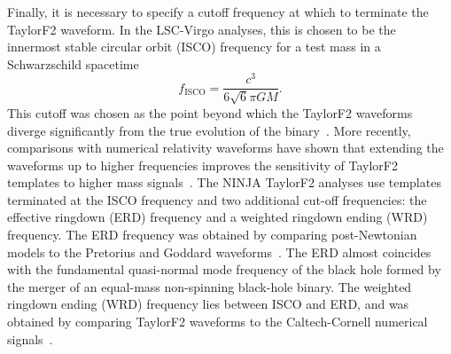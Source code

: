 Finally, it is necessary to specify a cutoff frequency at which to terminate the
TaylorF2 waveform. In the LSC-Virgo analyses, this is chosen to be the
innermost stable circular orbit (ISCO) frequency for a test mass in a
Schwarzschild spacetime 
%
\begin{equation}
\label{f_ISCO}
f_\mathrm{ISCO} = \frac{c^3}{6\sqrt{6}\pi GM}.
\end{equation}
%
This cutoff was chosen as the point beyond which the TaylorF2 waveforms
diverge significantly from the true evolution of the
binary~\cite{Blanchet:2002av}.  More recently, comparisons with numerical
relativity waveforms have shown that extending the waveforms up to higher
frequencies improves the sensitivity of TaylorF2 templates to higher mass
signals~\cite{Pan:2007nw,Boyle:2009dg}. The NINJA TaylorF2 analyses use
templates terminated at the ISCO frequency and two additional cut-off
frequencies: the effective ringdown (ERD) frequency and a weighted
ringdown ending (WRD) frequency. The ERD frequency was obtained by comparing
post-Newtonian models to the Pretorius and Goddard
waveforms~\cite{Pan:2007nw}. The ERD almost coincides with the fundamental
quasi-normal mode frequency of the black hole formed by the merger of an
equal-mass non-spinning black-hole binary. The weighted ringdown ending (WRD)
frequency lies between ISCO and ERD, and was obtained by comparing
TaylorF2 waveforms to the Caltech-Cornell numerical
signals~\cite{Boyle:2009dg}.

